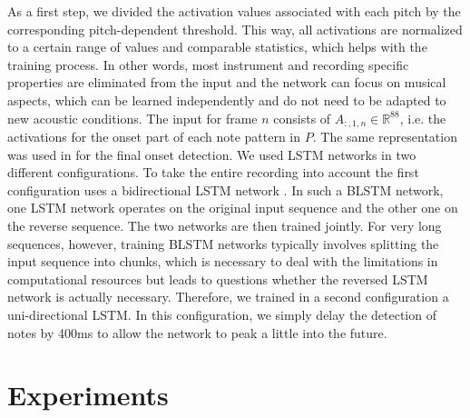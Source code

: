 \documentclass{article}
\def\R{{\mathbb R}}
\def\dict{{P}}
\newcommand{\ind}[1]{{_{#1}}}
\begin{document}
As a first step, we divided the activation values associated with each pitch by the corresponding pitch-dependent threshold. 
This way, all activations are normalized to a certain range of values and comparable statistics, which helps with the training process. 
In other words, most instrument and recording specific properties are eliminated from the input and the network can focus on musical aspects, which can be learned independently and do not need to be adapted to new acoustic conditions.
The input for frame $n$ consists of $A\ind{:,1,n}\in \R^{88}$, i.e. the activations for the onset part of each note pattern in $\dict$.
The same representation was used in \cite{EwertS16_PianoTranscriptionADMM_TASLP} for the final onset detection.
We used LSTM networks in two different configurations.
To take the entire recording into account the first configuration uses a bidirectional LSTM network \cite{GravesS2005_FramewisePhonemeBLSTM_NN}.
In such a BLSTM network, one LSTM network operates on the original input sequence and the other one on the reverse sequence.
The two networks are then trained jointly. 
For very long sequences, however, training BLSTM networks typically involves splitting the input sequence into chunks, which is necessary to deal with the limitations in computational resources but leads to questions whether the reversed LSTM network is actually necessary.
Therefore, we trained in a second configuration a uni-directional LSTM.
In this configuration, we simply delay the detection of notes by 400ms to allow the network to peak a little into the future. 

\section{Experiments}
\label{sec:experiments}
\end{document}

